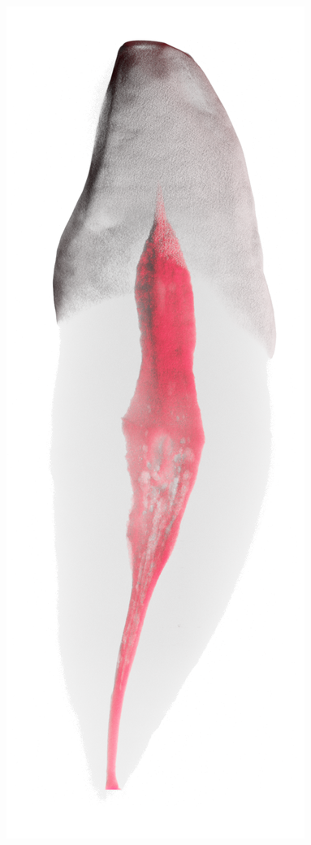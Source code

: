 \begin{frame}
\begin{frame}
		\includegraphics[height=\imheight]{./images/zmk/rcs/Tooth0353}%

\end{frame}
\end{frame}
